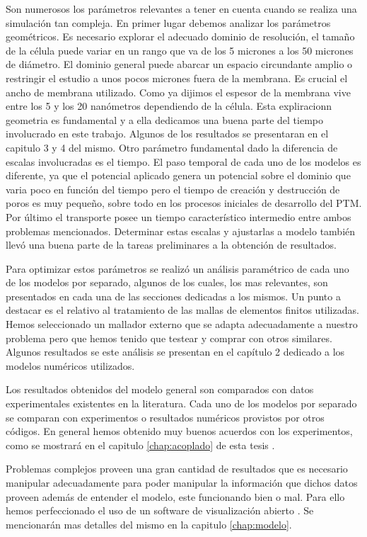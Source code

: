 Son numerosos los parámetros relevantes a tener en cuenta cuando se realiza una simulación tan compleja. En primer lugar debemos analizar los parámetros geométricos. Es necesario explorar el adecuado dominio de resolución, el tamaño de la célula puede variar en un rango que va de los 5 micrones a los 50 micrones de diámetro. El dominio general puede abarcar un espacio circundante amplio o restringir el estudio a unos pocos micrones fuera de la membrana. Es crucial el ancho de membrana utilizado. Como ya dijimos el espesor de la membrana vive entre los 5 y los 20 nanómetros dependiendo de la célula. Esta expliracionn geometria es fundamental y a ella dedicamos una buena parte del tiempo involucrado en este trabajo. Algunos de los resultados se presentaran en el capitulo 3 y 4 del mismo. Otro parámetro fundamental dado la diferencia de escalas involucradas es el tiempo. El paso temporal de cada uno de los modelos es diferente, ya que el potencial aplicado genera un potencial sobre el dominio que varia poco en función del tiempo pero el tiempo de creación y destrucción de poros es muy pequeño, sobre todo en los procesos iniciales de desarrollo del PTM. Por último el transporte posee un tiempo característico intermedio entre ambos problemas mencionados. Determinar estas escalas y ajustarlas a modelo también llevó una buena parte de la tareas preliminares a la obtención de resultados.

Para optimizar estos parámetros se realizó un análisis paramétrico de cada uno de los modelos por separado, algunos de los cuales, los mas relevantes, son presentados en cada una de las secciones dedicadas a los mismos. 
Un punto a destacar es el relativo al tratamiento de las mallas de elementos finitos utilizadas. Hemos seleccionado un mallador externo \cite{c11} que se adapta adecuadamente a nuestro problema pero que hemos tenido que testear y comprar con otros similares. Algunos resultados se este análisis se presentan en el capítulo 2 dedicado a los modelos numéricos utilizados.

Los resultados obtenidos del modelo general son comparados con datos experimentales existentes en la literatura. Cada uno de los modelos por separado se comparan con experimentos o resultados numéricos provistos por otros códigos. En general hemos obtenido muy buenos acuerdos con los experimentos, como se mostrará en el capitulo \ref{chap:acoplado} de esta tesis \cite{c6-fodava, krass07, c8}.

 Problemas complejos proveen una gran cantidad de resultados que es necesario manipular adecuadamente para poder manipular la información que dichos datos proveen además de entender el modelo, este funcionando bien o mal. Para ello hemos perfeccionado el uso de un software de visualización abierto \cite{c16}. Se mencionarán mas detalles del mismo en la capitulo \ref{chap:modelo}.
